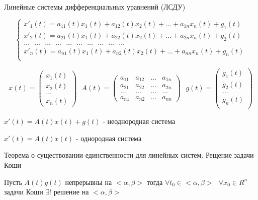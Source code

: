 \begin{title}[\Large]
  Линейные системы дифференциальных уравнений (ЛСДУ)
\end{title}

$$
\left\{
\begin{array}{l}
  x'_1(t) = a_{11}(t)x_1(t) + a_{12}(t)x_2(t) + \ldots
  + a_{1n}x_n(t) + g_1(t) \\
  x'_2(t) = a_{21}(t)x_1(t) + a_{22}(t)x_2(t) + \ldots
  + a_{2n}x_n(t) + g_2(t) \\
  \ldots ~~~ \ldots ~~~ \ldots ~~~ \ldots ~~~ \ldots ~~~ \ldots ~~~
  \ldots ~~~ \ldots ~~~ \ldots ~~~ \ldots\\
  x'_n(t) = a_{n1}(t)x_1(t) + a_{n2}(t)x_2(t) + \ldots
  + a_{nn}x_n(t) + g_n(t) \\
\end{array}
\right.
$$

$$
x(t) =
\left(
\begin{array}{l}
  x_1(t) \\
  x_2(t) \\
  \ldots \\
  x_n(t)
\end{array}
\right) ~~~
A(t) =
\left(
\begin{array}{cccc}
  a_{11} & a_{12} & \ldots & a_{1n} \\
  a_{21} & a_{22} & \ldots & a_{2n} \\
  \ldots & \ldots & \ldots & \ldots \\
  a_{n1} & a_{n2} & \ldots & a_{nn}
\end{array}
\right) ~~~
g(t) =
\left(
\begin{array}{l}
  g_1(t) \\
  g_2(t) \\
  \ldots \\
  g_n(t) \\
\end{array}
\right)
$$

$x'(t) = A(t)x(t) + g(t)$ - неоднородная система

$x'(t) = A(t)x(t)$ - однородная система

\begin{title}[\Large]
  Теорема о существовании единственности для линейных систем. Рещение задачи
  Коши
\end{title}

\begin{theorem}
  Пусть $A(t) g(t)$ непрерывны на $<\alpha, \beta>$ тогда
  $\forall t_0 \in <\alpha, \beta> ~~~ \forall x_0 \in R^n$ задачи Коши
  $\exists !$ решение на $<\alpha, \beta>$
\end{theorem}

